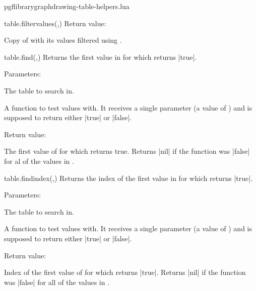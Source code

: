 \begin{filedescription}{pgflibrarygraphdrawing-table-helpers.lua}
\begin{luacommand}{{table.filter\textunderscore{}values}(,)}
Return value:
\begin{parameterdescription} 
  \item[] Copy of  with its values filtered using . 
\end{parameterdescription}


\end{luacommand}
\begin{luacommand}{{table.find}(,)}
Returns the first value in  for which  returns |true|. 

Parameters:
\begin{parameterdescription}
	\item[\meta{table}] The table to search in.\item[\meta{find\_func}] A function to test values with. It receives a single parameter (a value of ) and is supposed to return either |true| or |false|. 
\end{parameterdescription}


Return value:
\begin{parameterdescription} 
  \item[] The first value of  for which  returns true. Returns |nil| if the function was |false| for al of the values in . 
\end{parameterdescription}


\end{luacommand}
\begin{luacommand}{{table.find\textunderscore{}index}(,)}
Returns the index of the first value in  for which  returns |true|. 

Parameters:
\begin{parameterdescription}
	\item[\meta{table}] The table to search in.\item[\meta{find\_func}] A function to test values with. It receives a single parameter (a value of ) and is supposed to return either |true| or |false|. 
\end{parameterdescription}


Return value:
\begin{parameterdescription} 
  \item[] Index of the first value of  for which  returns |true|. Returns |nil| if the function was |false| for all of the values in . 
\end{parameterdescription}



\end{luacommand}
\end{filedescription}
